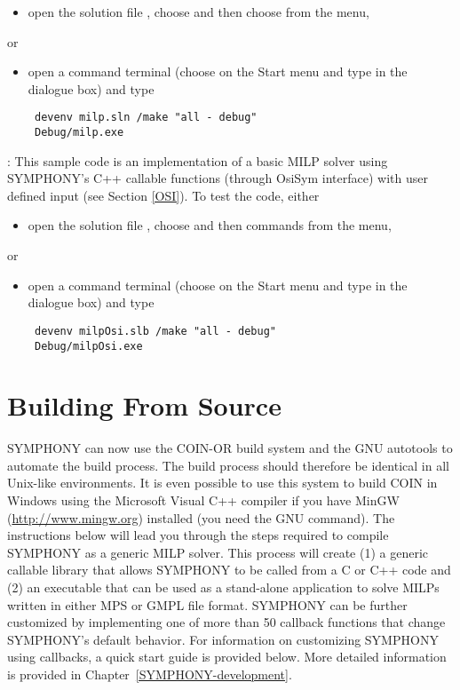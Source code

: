 \begin{itemize}
\begin{itemize}
\item open the solution file , choose 
and then choose  from the  menu, 
\end{itemize}
or
\begin{itemize}
\item open a command terminal (choose  on the Start menu and type
 in the dialogue box) and type 
{\color{Brown}
\begin{verbatim}
 devenv milp.sln /make "all - debug"
 Debug/milp.exe
 \end{verbatim}
}
\end{itemize}
: This sample code is an implementation of a basic MILP 
solver using SYMPHONY's C++ callable functions (through OsiSym interface)
with user defined input (see Section \ref{OSI}). To test the code, either 
\begin{itemize}
\item open the solution file , 
choose  and then 
 commands from the  menu, 
\end{itemize}
or
\begin{itemize}
\item open a command terminal (choose  on the Start menu and type
 in the dialogue box) and type 
{\color{Brown}
\begin{verbatim}
 devenv milpOsi.slb /make "all - debug"
 Debug/milpOsi.exe
 \end{verbatim}
}
\end{itemize}
\end{itemize}



\section{Building From Source} 
\label{building_from_source}

SYMPHONY can now use the COIN-OR build system and the GNU autotools to
automate the build process. The build process should therefore be identical in
all Unix-like environments. It is even possible to use this system to build
COIN in Windows using the Microsoft Visual C++ compiler if you have MinGW
(\url{http://www.mingw.org}) installed (you need the GNU  command).
The instructions below will lead you through the steps required to compile
SYMPHONY as a generic MILP solver. This process will create (1) a generic
callable library that allows SYMPHONY to be called from a C or C++ code and
(2) an executable that can be used as a stand-alone application to solve MILPs
written in either MPS or GMPL file format. SYMPHONY can be further customized
by implementing one of more than 50 callback functions that change SYMPHONY's
default behavior. For information on customizing SYMPHONY using callbacks, a
quick start guide is provided below. More detailed information is provided in
Chapter~\ref{SYMPHONY-development}.

